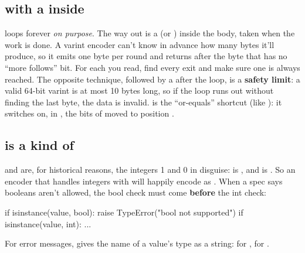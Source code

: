 \documentclass[10pt,a4paper]{article}
\begin{document}
\subsection{ with a  inside}
 loops forever \emph{on purpose}. The way out is a  (or ) inside the body, taken when the work is done. A varint encoder can’t know in advance how many bytes it’ll produce, so it emits one byte per round and returns after the byte that has no “more follows” bit. For each  you read, find every exit and make sure one is always reached.
The opposite technique,  followed by a  after the loop, is a \textbf{safety limit}: a valid 64-bit varint is at most 10 bytes long, so if the loop runs out without finding the last byte, the data is invalid.
 is the “or-equals” shortcut (like \code{+=\allowbreak{}}): it switches on, in , the bits of  moved to position .
\subsection{ is a kind of }
 and  are, for historical reasons, the integers 1 and 0 in disguise:  is , and  is . So an encoder that handles integers with  will happily encode  as . When a spec says booleans aren’t allowed, the bool check must come \textbf{before} the int check:
\begin{pycode}
if isinstance(value, bool):
    raise TypeError("bool not supported")
if isinstance(value, int):
    ...
\end{pycode}
For error messages,  gives the name of a value’s type as a string:  for ,  for .
\end{document}
